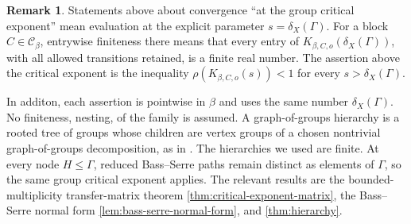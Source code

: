 \documentclass[11pt]{article}
\theoremstyle{definition}
\newtheorem*{remark*}{Remark}
\begin{document}
\begin{remark*}
Statements above about convergence ``at the group critical exponent'' mean evaluation at the
explicit parameter $s=\delta_X(\Gamma)$.  For a block $C\in\mathscr C_\beta$, entrywise finiteness there means that every entry of
$K_{\beta,C,o}(\delta_X(\Gamma))$, with all allowed transitions retained, is a finite real
number.  The assertion above the
critical exponent is the inequality $\rho(K_{\beta,C,o}(s))<1$ for every
$s>\delta_X(\Gamma)$.

In additon, each assertion is pointwise in $\beta$ and uses the same
number $\delta_X(\Gamma)$. No finiteness, nesting, of the family is assumed.  A
graph-of-groups hierarchy is a rooted tree of groups whose children are vertex groups of a
chosen nontrivial graph-of-groups decomposition, as in
\cite[Definition~2.1]{LouderTouikan2017}.  The hierarchies we used are finite.  At every
node $H\le\Gamma$, reduced Bass--Serre paths remain distinct as elements of $\Gamma$, so the
same group critical exponent applies.  The relevant results are the bounded-multiplicity
transfer-matrix theorem \cref{thm:critical-exponent-matrix}, the Bass--Serre normal form
\cref{lem:bass-serre-normal-form}, and \cref{thm:hierarchy}.
\end{remark*}
\end{document}
